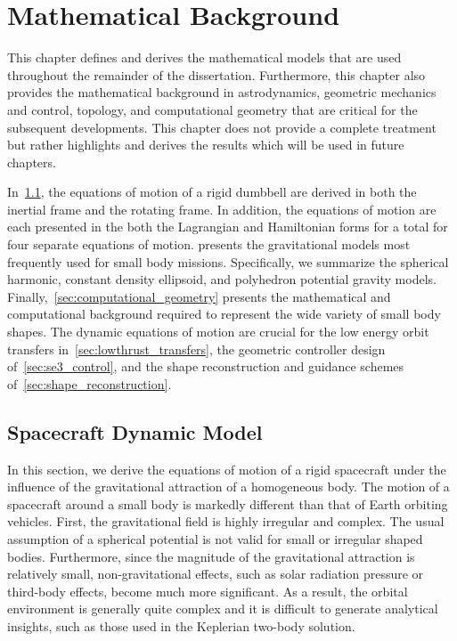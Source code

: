 
\chapter{Mathematical Background}\label{sec:mathematical_background}
This chapter defines and derives the mathematical models that are used throughout the remainder of the dissertation.
Furthermore, this chapter also provides the mathematical background in astrodynamics, geometric mechanics and control, topology, and computational geometry that are critical for the subsequent developments.
This chapter does not provide a complete treatment but rather highlights and derives the results which will be used in future chapters.

In~\cref{sec:dumbbell}, the equations of motion of a rigid dumbbell are derived in both the inertial frame and the rotating frame.
In addition, the equations of motion are each presented in the both the Lagrangian and Hamiltonian forms for a total for four separate equations of motion.
 presents the gravitational models most frequently used for small body missions. 
Specifically, we summarize the spherical harmonic, constant density ellipsoid, and polyhedron potential gravity models.
Finally,~\cref{sec:computational_geometry} presents the mathematical and computational background required to represent the wide variety of small body shapes.
The dynamic equations of motion are crucial for the low energy orbit transfers in~\cref{sec:lowthrust_transfers}, the geometric controller design of~\cref{sec:se3_control}, and the shape reconstruction and guidance schemes of~\cref{sec:shape_reconstruction}.

\section{Spacecraft Dynamic Model}\label{sec:dumbbell}

In this section, we derive the equations of motion of a rigid spacecraft under the influence of the gravitational attraction of a homogeneous body.
The motion of a spacecraft around a small body is markedly different than that of Earth orbiting vehicles.
First, the gravitational field is highly irregular and complex. 
The usual assumption of a spherical potential is not valid for small or irregular shaped bodies.
Furthermore, since the magnitude of the gravitational attraction is relatively small, non-gravitational effects, such as solar radiation pressure or third-body effects, become much more significant.
As a result, the orbital environment is generally quite complex and it is difficult to generate analytical insights, such as those used in the Keplerian two-body solution.


